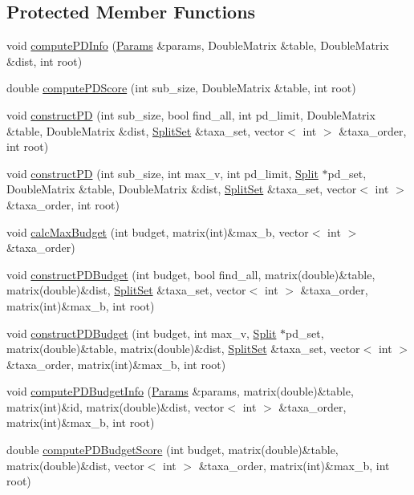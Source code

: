 \subsection*{Protected Member Functions}
\begin{DoxyCompactItemize}
\item 
void \hyperlink{classCircularNetwork_acb433def7804457703524e09beea5848}{computePDInfo} (\hyperlink{structParams}{Params} \&params, DoubleMatrix \&table, DoubleMatrix \&dist, int root)
\item 
double \hyperlink{classCircularNetwork_a948222663b8ba7352ef09d037814e25b}{computePDScore} (int sub\_\-size, DoubleMatrix \&table, int root)
\item 
void \hyperlink{classCircularNetwork_a7bfd9c6ef8b4810c421b6613cdd3eecc}{constructPD} (int sub\_\-size, bool find\_\-all, int pd\_\-limit, DoubleMatrix \&table, DoubleMatrix \&dist, \hyperlink{classSplitSet}{SplitSet} \&taxa\_\-set, vector$<$ int $>$ \&taxa\_\-order, int root)
\item 
void \hyperlink{classCircularNetwork_ad4b30f917950be55c1c2b2c5bc66dc3a}{constructPD} (int sub\_\-size, int max\_\-v, int pd\_\-limit, \hyperlink{classSplit}{Split} $\ast$pd\_\-set, DoubleMatrix \&table, DoubleMatrix \&dist, \hyperlink{classSplitSet}{SplitSet} \&taxa\_\-set, vector$<$ int $>$ \&taxa\_\-order, int root)
\item 
void \hyperlink{classCircularNetwork_a71bc1e5b303f8e0b51746e55cd3315e0}{calcMaxBudget} (int budget, matrix(int)\&max\_\-b, vector$<$ int $>$ \&taxa\_\-order)
\item 
void \hyperlink{classCircularNetwork_a18087619b5d6cc0b5c06c8e8daf65709}{constructPDBudget} (int budget, bool find\_\-all, matrix(double)\&table, matrix(double)\&dist, \hyperlink{classSplitSet}{SplitSet} \&taxa\_\-set, vector$<$ int $>$ \&taxa\_\-order, matrix(int)\&max\_\-b, int root)
\item 
void \hyperlink{classCircularNetwork_ac193309edd3ea5117af994273031f344}{constructPDBudget} (int budget, int max\_\-v, \hyperlink{classSplit}{Split} $\ast$pd\_\-set, matrix(double)\&table, matrix(double)\&dist, \hyperlink{classSplitSet}{SplitSet} \&taxa\_\-set, vector$<$ int $>$ \&taxa\_\-order, matrix(int)\&max\_\-b, int root)
\item 
void \hyperlink{classCircularNetwork_a07284c802eadf2367a90ed76eacad4ac}{computePDBudgetInfo} (\hyperlink{structParams}{Params} \&params, matrix(double)\&table, matrix(int)\&id, matrix(double)\&dist, vector$<$ int $>$ \&taxa\_\-order, matrix(int)\&max\_\-b, int root)
\item 
double \hyperlink{classCircularNetwork_a7656f85224812c604e818c4448ac79cf}{computePDBudgetScore} (int budget, matrix(double)\&table, matrix(double)\&dist, vector$<$ int $>$ \&taxa\_\-order, matrix(int)\&max\_\-b, int root)
\end{DoxyCompactItemize}


